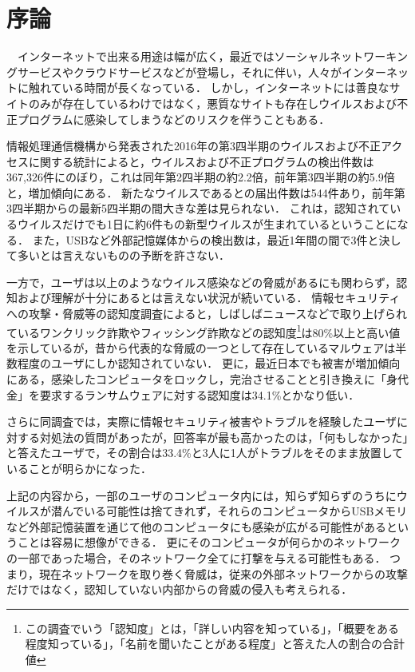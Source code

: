 \chapter{序論}

　インターネットで出来る用途は幅が広く，最近ではソーシャルネットワーキングサービスやクラウドサービスなどが登場し，それに伴い，人々がインターネットに触れている時間が長くなっている．
しかし，インターネットには善良なサイトのみが存在しているわけではなく，悪質なサイトも存在しウイルスおよび不正プログラムに感染してしまうなどのリスクを伴うこともある．

情報処理通信機構から発表された2016年の第3四半期のウイルスおよび不正アクセスに関する統計によると，ウイルスおよび不正プログラムの検出件数は367,326件にのぼり，これは同年第2四半期の約2.2倍，前年第3四半期の約5.9倍と，増加傾向にある\cite{joron2}．
新たなウイルスであるとの届出件数は544件あり，前年第3四半期からの最新5四半期の間大きな差は見られない．
これは，認知されているウイルスだけでも1日に約6件もの新型ウイルスが生まれているということになる．
また，USBなど外部記憶媒体からの検出数は，最近1年間の間で3件と決して多いとは言えないものの予断を許さない．

一方で，ユーザは以上のようなウイルス感染などの脅威があるにも関わらず，認知および理解が十分にあるとは言えない状況が続いている．
情報セキュリティへの攻撃・脅威等の認知度調査\cite{joron1}によると，しばしばニュースなどで取り上げられているワンクリック詐欺やフィッシング詐欺などの認知度\footnote{この調査でいう「認知度」とは，「詳しい内容を知っている」，「概要をある程度知っている」，「名前を聞いたことがある程度」と答えた人の割合の合計値}は80\%以上と高い値を示しているが，昔から代表的な脅威の一つとして存在しているマルウェアは半数程度のユーザにしか認知されていない．
更に，最近日本でも被害が増加傾向にある，感染したコンピュータをロックし，完治させることと引き換えに「身代金」を要求するランサムウェア\cite{ransomware}に対する認知度は34.1\%とかなり低い．

さらに同調査では，実際に情報セキュリティ被害やトラブルを経験したユーザに対する対処法の質問があったが，回答率が最も高かったのは，「何もしなかった」と答えたユーザで，その割合は33.4\%と3人に1人がトラブルをそのまま放置していることが明らかになった\cite{joron1}．

上記の内容から，一部のユーザのコンピュータ内には，知らず知らずのうちにウイルスが潜んでいる可能性は捨てきれず，それらのコンピュータからUSBメモリなど外部記憶装置を通じて他のコンピュータにも感染が広がる可能性があるということは容易に想像ができる．
更にそのコンピュータが何らかのネットワークの一部であった場合，そのネットワーク全てに打撃を与える可能性もある．
つまり，現在ネットワークを取り巻く脅威は，従来の外部ネットワークからの攻撃だけではなく，認知していない内部からの脅威の侵入も考えられる．

